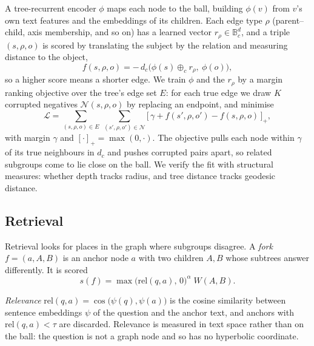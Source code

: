 \documentclass[11pt]{article}
\begin{document}
A tree-recurrent encoder $\phi$ maps each node to the ball, building $\phi(v)$
from $v$'s own text features and the embeddings of its children. Each edge type
$\rho$ (parent--child, axis membership, and so on) has a learned vector
$r_\rho \in \mathbb{B}^d_c$, and a triple $(s, \rho, o)$ is scored by translating
the subject by the relation and measuring distance to the object,
\begin{equation}
  f(s, \rho, o) = -\,d_c\bigl(\phi(s) \oplus_c r_\rho,\ \phi(o)\bigr),
\end{equation}
so a higher score means a shorter edge. We train $\phi$ and the $r_\rho$ by a
margin ranking objective over the tree's edge set $E$: for each true edge we draw
$K$ corrupted negatives $\mathcal{N}(s,\rho,o)$ by replacing an endpoint, and
minimise
\begin{equation}
  \mathcal{L} = \!\!\sum_{(s,\rho,o)\in E}\ \sum_{(s',\rho,o')\in \mathcal{N}}
  \!\!\bigl[\, \gamma + f(s',\rho,o') - f(s,\rho,o) \,\bigr]_+ ,
\end{equation}
with margin $\gamma$ and $[\cdot]_+ = \max(0, \cdot)$. The objective pulls each
node within $\gamma$ of its true neighbours in $d_c$ and pushes corrupted pairs
apart, so related subgroups come to lie close on the ball. We verify the fit
with structural measures: whether depth tracks radius, and tree distance tracks
geodesic distance.

\subsection{Retrieval}

Retrieval looks for places in the graph where subgroups disagree. A \emph{fork}
$f = (a, A, B)$ is an anchor node $a$ with two children $A, B$ whose subtrees
answer differently. It is scored
\begin{equation}
  s(f) = \max\bigl(\mathrm{rel}(q, a),\, 0\bigr)^{\alpha}\; W(A, B).
\end{equation}

\emph{Relevance} $\mathrm{rel}(q, a) = \cos\!\bigl(\psi(q), \psi(a)\bigr)$ is the
cosine similarity between sentence embeddings $\psi$ of the question and the
anchor text, and anchors with $\mathrm{rel}(q,a) < \tau$ are discarded.
Relevance is measured in text space rather than on the ball: the question is not
a graph node and so has no hyperbolic coordinate.
\end{document}
